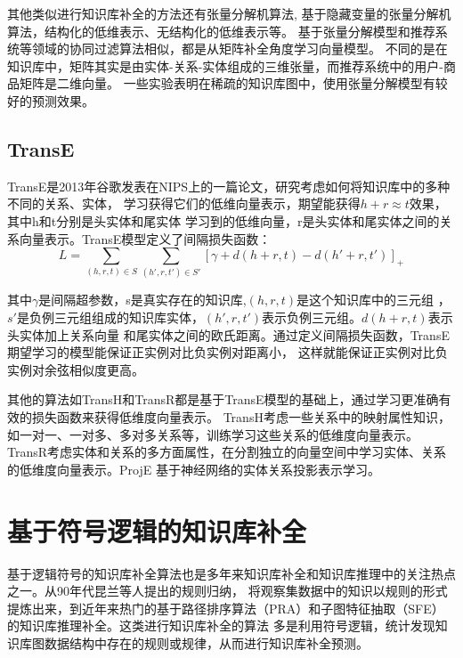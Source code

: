 其他类似进行知识库补全的方法还有张量分解机算法\cite{Rendle2010FactorizationM},
基于隐藏变量的张量分解机算法\cite{Rendle2012FactorizationMW}，结构化的低维表示\cite{2009EmbeddingLS}、无结构化的低维表示等。
基于张量分解模型和推荐系统等领域的协同过滤算法相似，都是从矩阵补全角度学习向量模型。
不同的是在知识库中，矩阵其实是由实体-关系-实体组成的三维张量，而推荐系统中的用户-商品矩阵是二维向量。
一些实验\cite{Dong2014}表明在稀疏的知识库图中，使用张量分解模型有较好的预测效果。

\subsection{TransE}
TransE是2013年谷歌发表在NIPS上的一篇论文，研究考虑如何将知识库中的多种不同的关系、实体，
学习获得它们的低维向量表示，期望能获得$h+r\approx t$效果，其中h和t分别是头实体和尾实体
学习到的低维向量，r是头实体和尾实体之间的关系向量表示。TransE模型定义了间隔损失函数：
$$L=\sum_{(h,r,t)\in S} \sum_{(h',r,t')\in S'}[\gamma+d(h+r,t)-d(h'+r,t')]_{+}$$

其中$\gamma$是间隔超参数，s是真实存在的知识库,$(h,r,t)$是这个知识库中的三元组
，$s'$是负例三元组组成的知识库实体，$(h',r,t')$表示负例三元组。$d(h+r,t)$表示头实体加上关系向量
和尾实体之间的欧氏距离。通过定义间隔损失函数，TransE期望学习的模型能保证正实例对比负实例对距离小，
这样就能保证正实例对比负实例对余弦相似度更高。

其他的算法如TransH和TransR都是基于TransE模型的基础上，通过学习更准确有效的损失函数来获得低维度向量表示。
TransH考虑一些关系中的映射属性知识，如一对一、一对多、多对多关系等，训练学习这些关系的低维度向量表示。
TransR\cite{Lin2015LearningEA}考虑实体和关系的多方面属性，在分割独立的向量空间中学习实体、关系的低维度向量表示。ProjE\cite{Shi2017ProjEEP}
基于神经网络的实体关系投影表示学习。

\section{基于符号逻辑的知识库补全}
\label{cha:symbolic}
基于逻辑符号的知识库补全算法也是多年来知识库补全和知识库推理中的关注热点之一。从90年代昆兰等人提出的规则归纳，
将观察集数据中的知识以规则的形式提炼出来，到近年来热门的基于路径排序算法（PRA）和子图特征抽取（SFE）的知识库推理补全。这类进行知识库补全的算法
多是利用符号逻辑，统计发现知识库图数据结构中存在的规则或规律，从而进行知识库补全预测。

